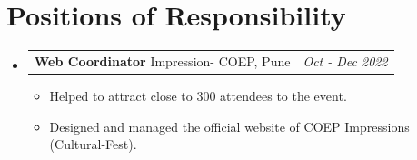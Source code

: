 \documentclass[a4paper,11pt]{article}
\makeatletter
\newcommand{\resumePOR}[3]{
\vspace{0.5mm}\item
    \begin{tabular*}{0.97\textwidth}[t]{l@{\extracolsep{\fill}}r}
        \textbf{#1}\hspace{0.3mm}#2 & \textit{\small{#3}} 
    \end{tabular*}
    \vspace{-2mm}
}
\newcommand{\resumeSubHeadingListStart}{\begin{itemize}[leftmargin=*,labelsep=0mm]}
\newcommand{\resumeItemListStart}{\begin{justify}\begin{itemize}[leftmargin=3ex, rightmargin=2ex, noitemsep,labelsep=1.2mm,itemsep=0mm]\small}
\newcommand{\resumeSubHeadingListEnd}{\end{itemize}\vspace{2mm}}
\newcommand{\resumeItemListEnd}{\end{itemize}\end{justify}\vspace{-2mm}}
\makeatother
\begin{document}
\section{\textbf{Positions of Responsibility}}
\vspace{-0.4mm}
\resumeSubHeadingListStart
\resumePOR{Web Coordinator } %
    {Impression- COEP, Pune} %
    {Oct - Dec 2022} %
    \resumeItemListStart
    \item {Helped to attract close to 300 attendees to the event.}
    \item {Designed and managed the official website of COEP Impressions (Cultural-Fest).}
    \resumeItemListEnd

\resumeSubHeadingListEnd
\vspace{-5mm}




    



\end{document}
